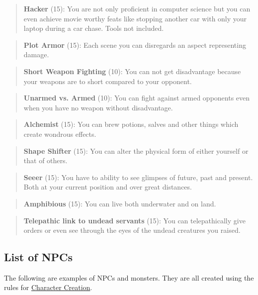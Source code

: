 \documentclass[11pt]{article}
\begin{document}
{\begin{quote}
\textbf{Hacker} (15): You are not only proficient in computer science but you can even achieve movie worthy feats like stopping another car with only your laptop during a car chase. Tools not included.
\end{quote}

\begin{quote}
\textbf{Plot Armor} (15): Each scene you can disregards an aspect representing damage. 
\end{quote}

\begin{quote}
\textbf{Short Weapon Fighting} (10): You can not get disadvantage because your weapons are to short compared to your opponent.
\end{quote}

\begin{quote}
\textbf{Unarmed vs. Armed} (10): You can fight against armed opponents even when you have no weapon without disadvantage.
\end{quote}

\begin{quote}
\textbf{Alchemist} (15): You can brew potions, salves and other things which create wondrous effects.
\end{quote}

\begin{quote}
\textbf{Shape Shifter} (15): You can alter the physical form of either yourself or that of others.
\end{quote}

\begin{quote}
\textbf{Seeer} (15): You have to ability to see glimpses of future, past and present. Both at your current position and over great distances. 
\end{quote}

\begin{quote}
\textbf{Amphibious} (15): You can live both underwater and on land.
\end{quote}

\begin{quote}
\textbf{Telepathic link to undead servants} (15): You can telepathically give orders or even see through the eyes of the undead creatures you raised. 
\end{quote}

\subsection{List of NPCs}
\label{sec:org80b35b5}
The following are examples of NPCs and monsters. They are all created using the rules for \hyperref[sec:org472b2c9]{Character Creation}. 

}
\end{document}
